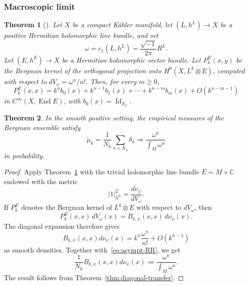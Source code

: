 \documentclass[12pt,a4paper,reqno]{article}
\theoremstyle{thmstyleone}
\newtheorem{theorem}{Theorem}[subsection]
\theoremstyle{thmstylethree}
\theoremstyle{thmstyletwo}
\numberwithin{equation}{subsection}
\def\geq{\geqslant}
\begin{document}
\subsubsection{Macroscopic limit}


\begin{theorem}[{\cite[Thms.~4.1.1--4.1.2]{MaMa}}]
\label{thm:MM-diagonal}
Let $X$ be a compact K\"ahler manifold, let $(L,h^L)\to X$ be a positive Hermitian holomorphic line bundle, and set
\[
    \omega=c_1(L,h^L)=\frac{\sqrt{-1}}{2\pi}R^L.
\]
Let $(E,h^E)\to X$ be a Hermitian holomorphic vector bundle. Let $P_k^E(x,y)$ be the Bergman kernel of the orthogonal projection onto $H^0(X,L^k\otimes E)$, computed with respect to $dV_\omega=\omega^n/n!$. Then, for every $m\geq 0$,
\[
    P_k^E(x,x)
    =
    k^n b_0(x)+k^{n-1}b_1(x)+\cdots+k^{n-m}b_m(x)
    +O(k^{n-m-1})
\]
in $C^\infty(X,\operatorname{End}E)$, with $b_0(x)=\operatorname{Id}_{E_x}.$
\end{theorem}

\begin{theorem}\label{thm:bergman-macroscopic-convergence}
In the smooth positive setting, the empirical measures of the Bergman ensemble
satisfy
\[
    \widehat\mu_k
    =
    \frac1{N_k}\sum_{x\in X_k}\delta_x
    \Longrightarrow
    \frac{\omega^n}{\int_M\omega^n}
\]
in probability.
\end{theorem}

\begin{proof}
Apply Theorem~\ref{thm:MM-diagonal} with the trivial holomorphic line bundle $E=M\times\mathbb C$ endowed with the metric
\[
    |1|_{h^E}^2=\frac{d\nu_\psi}{dV_\omega}.
\]
If $P_k^E$ denotes the Bergman kernel of $L^k\otimes E$ with respect to $dV_\omega$, then
\[
    P_k^E(x,x)\,dV_\omega(x)
    =
    B_{k,\psi}(x,x)\,d\nu_\psi(x).
\]
The diagonal expansion therefore gives
\[
    B_{k,\psi}(x,x)d\nu_\psi(x)
    =
    k^n\frac{\omega^n}{n!}+O(k^{n-1})
\]
as smooth densities. Together with~\eqref{eq:asympt-RR}, we get
\[
    \frac1{N_k}B_{k,\psi}(x,x)d\nu_\psi(x)
    \Longrightarrow
    \frac{\omega^n}{\int_M\omega^n}.
\]
The result follows from Theorem~\ref{thm:diagonal-transfer}.
\end{proof}
\end{document}
